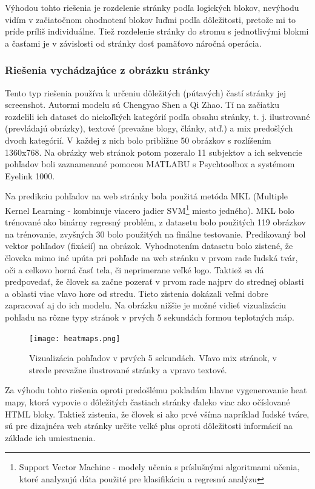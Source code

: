 	Výhodou tohto riešenia je rozdelenie stránky podľa logických blokov, nevýhodu vidím v začiatočnom ohodnotení blokov ľuďmi podľa dôležitosti, pretože mi to príde príliš individuálne. Tiež rozdelenie stránky do stromu s jednotlivými blokmi a časťami je v závislosti od stránky dosť pamäťovo náročná operácia. 
	
\subsubsection{Riešenia vychádzajúce z obrázku stránky}
\label{singapur}
	Tento typ riešenia používa k určeniu dôležitých (pútavých) častí stránky jej screenshot. Autormi modelu sú Chengyao Shen a Qi Zhao\cite{singapur_model}. Tí na začiatku rozdelili ich dataset do niekoľkých kategórií podľa obsahu stránky, t. j. ilustrované (prevládajú obrázky), textové (prevažne blogy, články, atď.) a mix predošlých dvoch kategórií. V každej z nich bolo približne 50 obrázkov s rozlíšením 1360x768. Na obrázky web stránok  potom pozeralo 11 subjektov a ich sekvencie pohľadov boli zaznamenané pomocou MATLABU s Psychtoolbox\cite{psych} a systémom Eyelink 1000.
	
	Na predikciu pohľadov\cite{saliency} na web stránky bola použitá metóda MKL (Multiple Kernel Learning - kombinuje viacero jadier SVM\footnote{Support Vector Machine - modely učenia s príslušnými algoritmami učenia, ktoré analyzujú dáta použité pre klasifikáciu a regresnú analýzu\cite{SVM}} miesto jedného). MKL bolo trénované ako binárny regresný problém, z datasetu bolo použitých 119 obrázkov na trénovanie, zvyšných 30 bolo použitých na finálne testovanie. Predikovaný bol vektor pohľadov (fixácií) na obrázok. Vyhodnotením datasetu bolo zistené, že človeka mimo iné upúta pri pohľade na web stránku v prvom rade ľudská tvár, oči a celkovo horná časť tela, či neprimerane veľké logo. Taktiež sa dá predpovedať, že človek sa začne pozerať v prvom rade najprv do strednej  oblasti a oblasti viac vľavo hore od stredu. Tieto zistenia dokázali veľmi dobre zapracovať aj do ich modelu. Na obrázku nižšie je možné vidieť vizualizáciu pohľadu na rôzne typy stránok v prvých 5 sekundách formou teplotných máp.
		\begin{figure}[H]
			\begin{center}\texttt{[image: heatmaps.png]}\end{center}
			\caption[Vizualizácia pohľadu formou teplotných máp]{Vizualizácia pohľadov v prvých 5 sekundách. Vľavo mix stránok, v strede prevažne ilustrované stránky a vpravo textové.\cite{singapur_model}}%
		\end{figure}
		
	Za výhodu tohto riešenia oproti predošlému pokladám hlavne vygenerovanie heat mapy, ktorá vypovie o dôležitých častiach stránky ďaleko viac ako očíslované HTML bloky. Taktiež zistenia, že človek si ako prvé všíma napríklad ľudské tváre, sú pre dizajnéra web stránky určite velké plus oproti dôležitosti informácií na základe ich umiestnenia. 
\fi